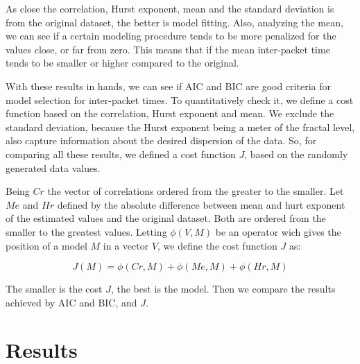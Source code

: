 As close the correlation, Hurst exponent, mean and the standard deviation is from the original dataset, the better is model fitting. Also, analyzing the mean, we can see if a certain modeling procedure tends to be more penalized for the values close, or far from zero. This means that if the mean inter-packet time tends to be smaller or higher compared to the original. 

With these results in hands, we can see if AIC and BIC are good criteria for model selection for inter-packet times. To quantitatively check it, we define a cost function based on the correlation, Hurst exponent and mean. We exclude the standard deviation, because the Hurst exponent being a meter of the fractal level, also capture information about the desired dispersion of the data. So, for comparing all these results, we defined a cost function $J$, based on the randomly generated data values.

Being $Cr$ the vector of correlations ordered from the greater to the smaller. Let $Me$ and $Hr$ defined by the absolute difference between mean and hurt exponent of the estimated values and the original dataset. Both are ordered from the smaller to the greatest values. Letting $\phi(V, M)$ be an operator wich gives the position of a model $M$ in a vector $V$, we define the cost function $J$ as:


\begin{equation}
J(M) = \phi(Cr, M) + \phi(Me, M) + \phi(Hr, M)
\end{equation}

The smaller is the cost $J$, the best is the model. Then we compare the results achieved by AIC and BIC, and $J$.

\section{Results}


